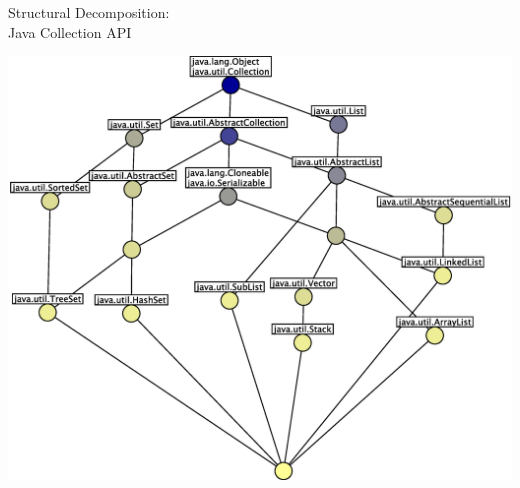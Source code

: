 \documentclass[pdf,prettybox]{prosper}
\begin{document}
\begin{slide}{Structural Decomposition:\\Java Collection API}
 \begin{center}
  \includegraphics[height=0.8 \textheight]{img/class-hierarchy.eps}
 \end{center}
\end{slide}
\end{document}
